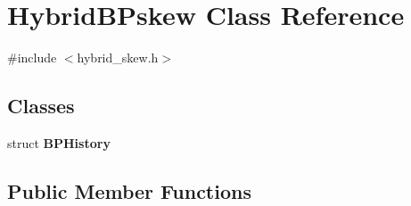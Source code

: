 \hypertarget{classHybridBPskew}{
\section{HybridBPskew Class Reference}
\label{classHybridBPskew}
}


{\ttfamily \#include $<$hybrid\_\-skew.h$>$}

\subsection*{Classes}
\begin{DoxyCompactItemize}
\item 
struct {\bfseries BPHistory}
\end{DoxyCompactItemize}
\subsection*{Public Member Functions}

